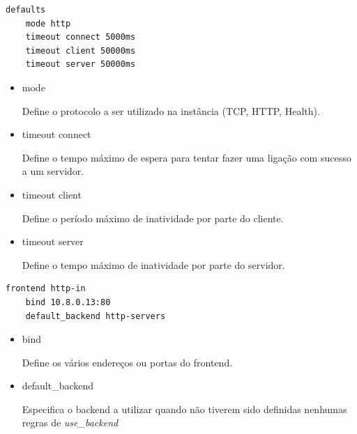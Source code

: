 \documentclass[12pt,a4paper]{article}
\begin{document}
\begin{verbatim}
defaults  
    mode http
    timeout connect 5000ms
    timeout client 50000ms
    timeout server 50000ms

\end{verbatim}

\begin{itemize}
    \item mode
    
Define o protocolo a ser utilizado na instância (TCP, HTTP, Health).
    
    \item timeout connect
    
Define o tempo máximo de espera para tentar fazer uma ligação com sucesso a um servidor.
    
    \item timeout client
    
Define o período máximo de inatividade por parte do cliente.
    
    \item timeout server
    
Define o tempo máximo de inatividade por parte do servidor.
    
\end{itemize}


\begin{verbatim}
frontend http-in  
    bind 10.8.0.13:80
    default_backend http-servers

\end{verbatim}

\begin{itemize}
    \item bind
    
Define os vários endereços ou portas do frontend.
    
    \item default\_backend 
    
Especifica o backend a utilizar quando não tiverem sido definidas nenhumas regras de \emph{use\_backend}
\end{itemize}
\end{document}
